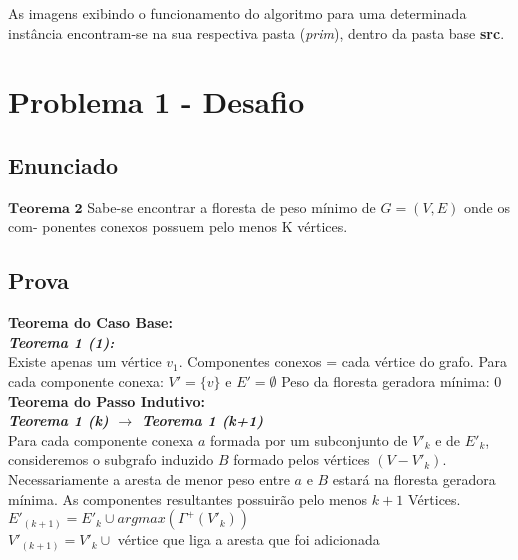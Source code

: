 \documentclass[12pt]{article}
\begin{document}
\indent As imagens exibindo o funcionamento do algoritmo para uma determinada instância encontram-se na sua respectiva pasta (\textit{prim}), dentro da pasta base \textbf{src}. 


\section{Problema 1 - Desafio}

\subsection{ Enunciado }
\indent $\mathbf{Teorema}$ $\mathbf{2}$ Sabe-se encontrar a floresta de peso mínimo de $G = (V, E)$ onde os com-
ponentes conexos possuem pelo menos K vértices.


\subsection{ Prova }

\textbf{Teorema do Caso Base:}\\

\textit{\textbf{Teorema 1 (1):}}\\
Existe apenas um vértice $v_1$.
Componentes conexos = cada vértice do grafo.
Para cada componente conexa: $V'=\{v\}$ e $E' = \emptyset$
Peso da floresta geradora mínima: 0\\

\textbf{Teorema do Passo Indutivo:}\\

\textit{\textbf{Teorema 1 (k) $\rightarrow$ Teorema 1 (k+1)}}\\
Para cada componente conexa $a$ formada por um subconjunto de $V'_k$ e de $E'_k$, consideremos o subgrafo induzido $B$ formado pelos vértices $\left( V - V'_k \right)$. Necessariamente a aresta de menor peso entre $a$ e $B$ estará na floresta geradora mínima. As componentes resultantes possuirão
pelo menos $k + 1$ Vértices.\\

$E'_{(k+1)} = E'_k \cup {argmax(\Gamma^+(V'_k))}$\\
$V'_{(k+1)} = V'_k \cup$ vértice que liga a aresta que foi adicionada\\
\end{document}
